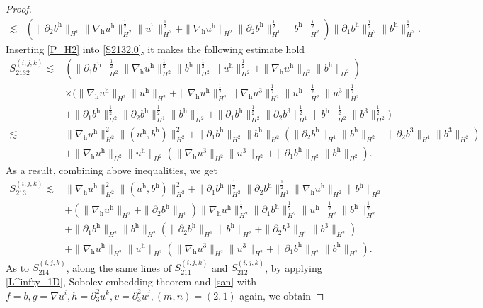 \documentclass[11pt]{amsart}
\theoremstyle{definition}
\newcommand{\h}{\mathrm{h}}
\newcommand{\nablah}{\nabla_{\mathrm{h}}}
\numberwithin{equation}{section}
\begin{document}
\begin{proof}
\begin{align}
		\lesssim&\left(\|\partial_2b^\h\|_{H^1}\|\nablah u^\h\|_{H^2}^\frac12\| u^\h\|_{H^2}^\frac12+\|\nablah u^\h\|_{H^2}\|\partial_2b^\h\|_{H^1}^\frac12\|b^\h\|_{H^2}^\frac12 \right) \|\partial_1b^\h\|_{H^2}^\frac12\| b^\h\|_{H^2}^\frac12.\nonumber
	\end{align}
	Inserting \eqref{P_H2} into \eqref{S2132.0}, it makes the following estimate hold
	\begin{align*}
		S^{(i,j,k)}_{2132}
		\lesssim&\left(\|\partial_1b^\h\|_{H^2}^\frac12\|\nablah u^\h\|_{H^2}^\frac12\| b^\h\|_{H^2}^\frac12\| u^\h\|_{H^2}^\frac12+\|\nablah u^\h\|_{H^2}\|b^\h\|_{H^2}\right)\nonumber\\
		&\times\bigg(\|\nablah u^\h\|_{H^2}\|u^\h\|_{H^2}+ \|\nablah u^\h\|_{H^2}^\frac12\|\nablah u^3\|_{H^2}^\frac12\|u^\h\|_{H^2}^\frac12\|u^3\|_{H^2}^\frac12 \nonumber\\
		&+\|\partial_1b^\h\|_{H^2}^\frac12\|\partial_2b^\h\|_{H^1}^\frac12\|b^\h\|_{H^2}+\|\partial_1b^\h\|_{H^2}^\frac12\|\partial_2b^3\|_{H^1}^\frac12\|b^\h\|_{H^2}^\frac12\|b^3\|_{H^2}^\frac12\bigg)\nonumber\\
		\lesssim&\|\nablah u^\h\|_{H^2}^2\|(u^\h,b^\h)\|_{H^2}^2+\|\partial_1b^\h\|_{H^2}\|b^\h\|_{H^2}\left(\|\partial_2b^\h\|_{H^1}\|b^\h\|_{H^2}+\|\partial_2b^3\|_{H^1}\|b^3\|_{H^2}\right)\nonumber\\
		&+ \|\nablah u^\h\|_{H^2}\|u^\h\|_{H^2}\left(\|\nablah u^3\|_{H^2}\|u^3\|_{H^2}+\|\partial_1b^\h\|_{H^2}\| b^\h\|_{H^2}\right).
	\end{align*}
	As a result, combining above inequalities, we get
	\begin{align}\label{S213}
		S^{(i,j,k)}_{213}\lesssim&\|\nablah u^\h\|_{H^2}^2\|(u^\h,b^\h)\|_{H^2}^2+\|\partial_1b^\h\|_{H^2}^\frac12\|\partial_2b^\h\|_{H^1}^\frac12\|\nablah u^\h\|_{H^2}\|b^\h\|_{H^2}\nonumber\\
		&+\left(\|\nablah u^\h\|_{H^2}+\|\partial_2b^\h\|_{H^1}\right)\|\nablah u^\h\|_{H^2}^\frac12\|\partial_1b^\h\|_{H^2}^\frac12\| u^\h\|_{H^2}^\frac12  \| b^\h\|_{H^2}^\frac12\nonumber\\
		&+\|\partial_1b^\h\|_{H^2}\|b^\h\|_{H^2}\left(\|\partial_2b^\h\|_{H^1}\|b^\h\|_{H^2}+\|\partial_2b^3\|_{H^1}\|b^3\|_{H^2}\right)\nonumber\\
		&+ \|\nablah u^\h\|_{H^2}\|u^\h\|_{H^2}\left(\|\nablah u^3\|_{H^2}\|u^3\|_{H^2}+\|\partial_1b^\h\|_{H^2}\| b^\h\|_{H^2}\right).
	\end{align}
	As to  $S^{(i,j,k)}_{214}$,  along the same lines of  $S^{(i,j,k)}_{211}$ and $S^{(i,j,k)}_{212}$, by applying \eqref{L^infty_1D}, Sobolev embedding theorem and \eqref{san} with $f=b,g=\nabla u^i,h=\partial_3^2u^k,v=\partial_3^2u^j,(m,n)=(2,1)$ again, we obtain

\end{proof}
\end{document}
